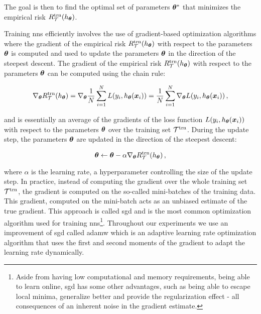 The goal is then to find the optimal set of parameters ${\boldsymbol{\theta}}^*$ that minimizes the empirical risk $R_\mathcal{T}^\text{trn}(h_{{\boldsymbol{\theta}}})$.

Training \glspl{nn} efficiently involves the use of gradient-based optimization algorithms where the gradient of the
empirical risk $R_\mathcal{T}^\text{trn}(h_{{\boldsymbol{\theta}}})$ with respect to the parameters ${\boldsymbol{\theta}}$ is computed and used to update the parameters
${\boldsymbol{\theta}}$ in the direction of the steepest descent. The gradient of the empirical risk $R_\mathcal{T}^\text{trn}(h_{{\boldsymbol{\theta}}})$ with respect to
the parameters ${\boldsymbol{\theta}}$ can be computed using the chain rule:

\begin{equation}
    \nabla_{{\boldsymbol{\theta}}} R_\mathcal{T}^\text{trn}(h_{{\boldsymbol{\theta}}}) = \nabla_{{\boldsymbol{\theta}}} \frac{1}{N} \sum_{i=1}^{N} L(y_i, h_{{\boldsymbol{\theta}}}(\bm{x}_i)) = \frac{1}{N} \sum_{i=1}^{N} \nabla_{{\boldsymbol{\theta}}} L(y_i, h_{{\boldsymbol{\theta}}}(\bm{x}_i))\,,
\end{equation}

and is essentially an average of the gradients of the loss function $L(y_i, h_{{\boldsymbol{\theta}}}(\bm{x}_i))$ with respect to the
parameters ${\boldsymbol{\theta}}$ over the training set $\mathcal{T}^\text{trn}$. During the update step, the parameters ${\boldsymbol{\theta}}$ are updated in the
direction of the steepest descent:

\begin{equation}
    {\ensuremath{\boldsymbol{\theta}}} \leftarrow {\ensuremath{\boldsymbol{\theta}}} - \alpha \nabla_{{\boldsymbol{\theta}}} R_\mathcal{T}^\text{trn}(h_{{\boldsymbol{\theta}}})\,,
\end{equation}

where $\alpha$ is the learning rate, a hyperparameter controlling the size of the update step. In practice,
instead of computing the gradient over the whole training set $\mathcal{T}^\text{trn}$, the gradient is computed on the so-called
mini-batches of the training data. This gradient, computed on the mini-batch acts as an unbiased estimate of the true
gradient. This approach is called \gls{sgd} and is the most common optimization algorithm used for training
\glspl{nn}\footnote{Aside from having low computational and
    memory requirements, being able to learn online, \gls{sgd} has some other advantages, such as being able to escape
    local minima, generalize better and provide the regularization effect - all consequences of an inherent noise in the
    gradient estimate.}.
Throughout our experiments we use an improvement of \gls{sgd} called \gls{adamw} \cite{adam, adamw} which is an adaptive
learning rate optimization algorithm that uses the first and second moments of the gradient to adapt the learning rate
dynamically.

